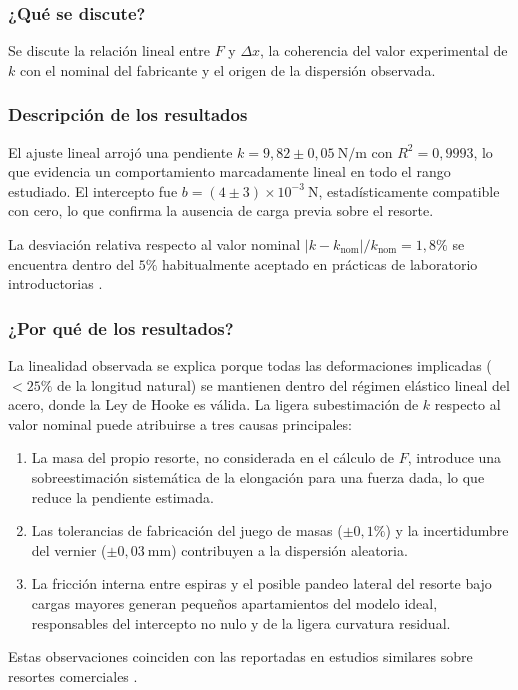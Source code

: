 \documentclass[conference,10pt]{IEEEtran}
\begin{document}
\subsubsection*{¿Qué se discute?}
Se discute la relación lineal entre $F$ y $\Delta x$, la coherencia
del valor experimental de $k$ con el nominal del fabricante y el
origen de la dispersión observada.

\subsubsection*{Descripción de los resultados}
El ajuste lineal arrojó una pendiente
$k = 9{,}82 \pm 0{,}05\ \mathrm{N/m}$ con $R^2 = 0{,}9993$, lo que
evidencia un comportamiento marcadamente lineal en todo el rango
estudiado. El intercepto fue $b = (4 \pm 3) \times 10^{-3}\ \mathrm{N}$,
estadísticamente compatible con cero, lo que confirma la ausencia de
carga previa sobre el resorte.

La desviación relativa respecto al valor nominal
$|k - k_{\text{nom}}|/k_{\text{nom}} = 1{,}8\%$ se encuentra dentro
del $5\%$ habitualmente aceptado en prácticas de laboratorio
introductorias \cite{Taylor1997}.

\subsubsection*{¿Por qué de los resultados?}
La linealidad observada se explica porque todas las deformaciones
implicadas ($< 25\%$ de la longitud natural) se mantienen dentro del
régimen elástico lineal del acero, donde la Ley de Hooke es válida.
La ligera subestimación de $k$ respecto al valor nominal puede
atribuirse a tres causas principales:
\begin{enumerate}
  \item La masa del propio resorte, no considerada en el cálculo de
        $F$, introduce una sobreestimación sistemática de la elongación
        para una fuerza dada, lo que reduce la pendiente estimada.
  \item Las tolerancias de fabricación del juego de masas ($\pm 0{,}1\%$)
        y la incertidumbre del vernier ($\pm 0{,}03\ \mathrm{mm}$)
        contribuyen a la dispersión aleatoria.
  \item La fricción interna entre espiras y el posible pandeo lateral
        del resorte bajo cargas mayores generan pequeños apartamientos
        del modelo ideal, responsables del intercepto no nulo y de la
        ligera curvatura residual.
\end{enumerate}
Estas observaciones coinciden con las reportadas en estudios similares
sobre resortes comerciales \cite{Giancoli2008}.
\end{document}
